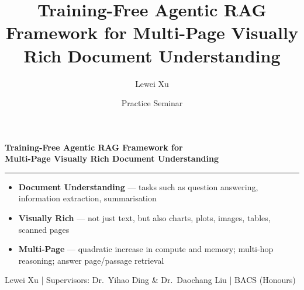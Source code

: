 \documentclass[aspectratio=169]{beamer}
\title{Training-Free Agentic RAG Framework for Multi-Page Visually Rich Document Understanding}
\author{Lewei Xu}
\institute{Supervisors: Dr.\ Yihao Ding \& Dr.\ Daochang Liu}
\date{Practice Seminar}
\begin{document}
\begin{frame}

  \vspace{0.6cm}
  {\Large\bfseries Training-Free Agentic RAG Framework for\\[0.3em]
  Multi-Page Visually Rich Document Understanding}

  \vspace{0.5cm}
  \hrule
  \vspace{0.4cm}

  \small
  \begin{itemize}
    \item \textbf{Document Understanding} — tasks such as question answering,
          information extraction, summarisation
    \item \textbf{Visually Rich} — not just text, but also charts, plots,
          images, tables, scanned pages
    \item \textbf{Multi-Page} — quadratic increase in compute and memory;
          multi-hop reasoning; answer page/passage retrieval
  \end{itemize}

  \vspace{0.3cm}
  \footnotesize\color{gray}
  Lewei Xu \quad|\quad
  Supervisors: Dr.\ Yihao Ding \& Dr.\ Daochang Liu \quad|\quad
  BACS (Honours)

\end{frame}
\end{document}

